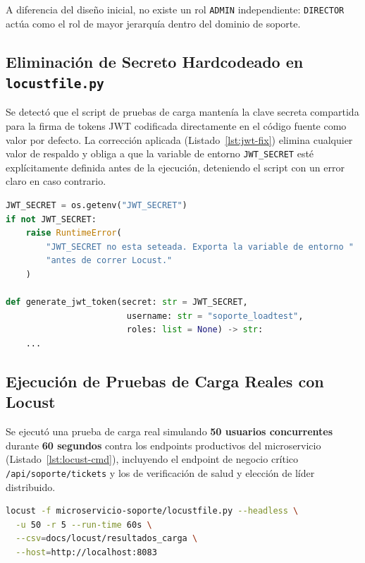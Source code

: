 ﻿\documentclass[11pt,a4paper]{article}
\begin{document}
\noindent A diferencia del dise\~no inicial, no existe un rol \texttt{ADMIN} independiente: \texttt{DIRECTOR} act\'ua como el rol de mayor jerarqu\'ia dentro del dominio de soporte.

\subsection{Eliminaci\'on de Secreto Hardcodeado en \texttt{locustfile.py}}
Se detect\'o que el script de pruebas de carga manten\'ia la clave secreta compartida para la firma de tokens JWT codificada directamente en el c\'odigo fuente como valor por defecto. La correcci\'on aplicada (Listado~\ref{lst:jwt-fix}) elimina cualquier valor de respaldo y obliga a que la variable de entorno \texttt{JWT\_SECRET} est\'e expl\'icitamente definida antes de la ejecuci\'on, deteniendo el script con un error claro en caso contrario.

\begin{lstlisting}[language=Python,caption={Lectura obligatoria del secreto JWT desde variable de entorno (\texttt{locustfile.py}).},label={lst:jwt-fix}]
JWT_SECRET = os.getenv("JWT_SECRET")
if not JWT_SECRET:
    raise RuntimeError(
        "JWT_SECRET no esta seteada. Exporta la variable de entorno "
        "antes de correr Locust."
    )

def generate_jwt_token(secret: str = JWT_SECRET,
                        username: str = "soporte_loadtest",
                        roles: list = None) -> str:
    ...
\end{lstlisting}

\subsection{Ejecuci\'on de Pruebas de Carga Reales con Locust}
Se ejecut\'o una prueba de carga real simulando \textbf{50 usuarios concurrentes} durante \textbf{60 segundos} contra los endpoints productivos del microservicio (Listado~\ref{lst:locust-cmd}), incluyendo el endpoint de negocio cr\'itico \texttt{/api/soporte/tickets} y los de verificaci\'on de salud y elecci\'on de l\'ider distribuido.

\begin{lstlisting}[language=bash,caption={Comando de ejecuci\'on de la prueba de carga real.},label={lst:locust-cmd}]
locust -f microservicio-soporte/locustfile.py --headless \
  -u 50 -r 5 --run-time 60s \
  --csv=docs/locust/resultados_carga \
  --host=http://localhost:8083
\end{lstlisting}
\end{document}
